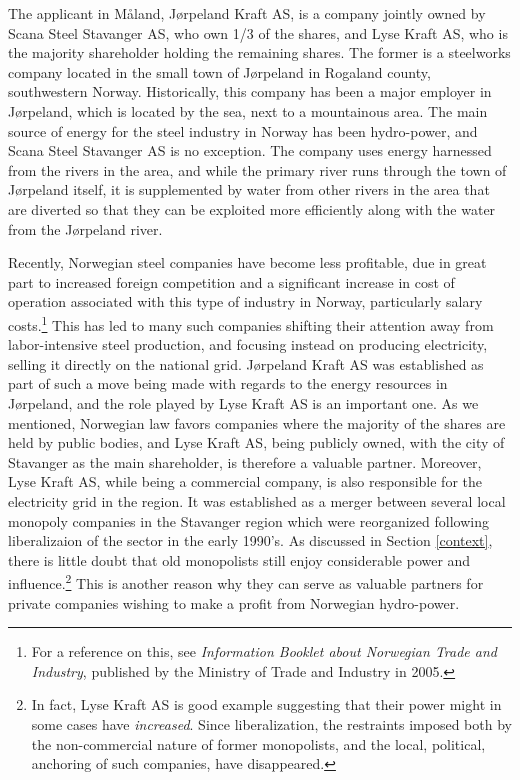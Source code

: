 The applicant in Måland, Jørpeland Kraft AS, is a company jointly owned by Scana Steel Stavanger AS, who own 1/3 of the shares, and Lyse Kraft AS, who is the majority shareholder holding the remaining shares. The former is a steelworks company located in the small town of Jørpeland in Rogaland county, southwestern Norway. Historically, this company has been a major employer in Jørpeland, which is located by the sea, next to a mountainous area. The main source of energy for the steel industry in Norway has been hydro-power, and Scana Steel Stavanger AS is no exception. The company uses energy harnessed from the rivers in the area, and while the primary river runs through the town of Jørpeland itself, it is supplemented by water from other rivers in the area that are diverted so that they can be exploited more efficiently along with the water from the Jørpeland river.

Recently, Norwegian steel companies have become less profitable, due in great part to increased foreign competition and a significant increase in cost of operation associated with this type of industry in Norway, particularly salary costs.\footnote{For a reference on this, see \emph{Information Booklet about Norwegian Trade and Industry}, published by the Ministry of Trade and Industry in 2005.} This has led to many such companies shifting their attention away from labor-intensive steel production, and focusing instead on producing electricity, selling it directly on the national grid. Jørpeland Kraft AS was established as part of such a move being made with regards to the energy resources in Jørpeland, and the role played by Lyse Kraft AS is an important one. As we mentioned, Norwegian law favors companies where the majority of the shares are held by public bodies, and Lyse Kraft AS, being publicly owned, with the city of Stavanger as the main shareholder, is therefore a valuable partner. Moreover, Lyse Kraft AS, while being a commercial company, is also responsible for the electricity grid in the region. It was established as a merger between several local monopoly companies in the Stavanger region which were reorganized following liberalizaion of the sector in the early 1990's. As discussed in Section \ref{context}, there is little doubt that old monopolists still enjoy considerable power and influence.\footnote{In fact, Lyse Kraft AS is good example suggesting that their power might in some cases have \emph{increased}. Since liberalization, the restraints imposed both by the non-commercial nature of former monopolists, and the local, political, anchoring of such companies, have disappeared.} This is another reason why they can serve as valuable partners for private companies wishing to make a profit from Norwegian hydro-power.

